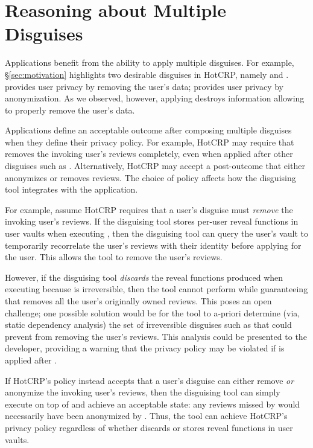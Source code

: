 \section{Reasoning about Multiple Disguises}

Applications benefit from the ability to apply multiple disguises. For example,
\S\ref{sec:motivation} highlights two desirable disguises in HotCRP, namely \gdpr and \ca. \gdpr
provides user privacy by removing the user's data; \ca provides user privacy by anonymization.
As we observed, however, applying \ca destroys information allowing \gdpr to properly remove the
user's data.

Applications define an acceptable outcome after composing multiple disguises when they define their
privacy policy.
For example, HotCRP may require that \gdpr removes the invoking user's reviews completely, even when
applied after other disguises such as \ca.  Alternatively, HotCRP may accept a post-\gdpr outcome that either
anonymizes or removes reviews. 
The choice of policy affects how the disguising tool integrates with the application.

For example, assume HotCRP requires that a user's \gdpr disguise must \emph{remove} the invoking
user's reviews. If the disguising tool stores per-user reveal functions in user vaults when
executing \ca, then the disguising tool can query the user's vault to temporarily recorrelate the
user's reviews with their identity before applying \gdpr for the user.  This allows the tool to
remove the user's reviews.
%

However, if the disguising tool \emph{discards} the reveal functions produced
when executing \ca because \ca is irreversible, then the tool cannot perform \gdpr while guaranteeing that \gdpr removes all the user's originally owned reviews.
This poses an open challenge; one possible solution would be for 
the tool to a-priori determine (via, \eg static dependency analysis) the set of irreversible disguises
such as \ca that could prevent \gdpr from removing the user's reviews. This analysis could be
presented to the developer, providing a warning that the privacy policy may be violated if \gdpr is
applied after \ca.

If HotCRP's policy instead accepts that a user's \gdpr disguise can either remove \emph{or} anonymize the
invoking user's reviews, then the disguising tool can simply execute \gdpr on top of \ca and achieve
an acceptable state: any reviews missed by \gdpr would necessarily have been anonymized by \ca.
Thus, the tool can achieve HotCRP's privacy policy regardless of whether \ca discards or stores
reveal functions in user vaults.
